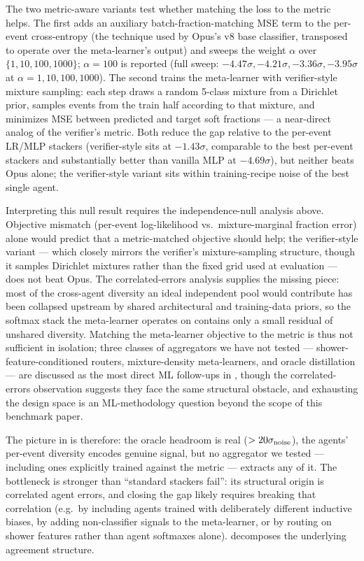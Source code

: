 \documentclass[universe,article,submit,pdftex,oneauthor]{Definitions/mdpi}
\begin{document}
The two metric-aware variants test whether matching the loss to the metric helps. The first adds an auxiliary batch-fraction-matching MSE term to the per-event cross-entropy (the technique used by Opus's v8 base classifier, transposed to operate over the meta-learner's output) and sweeps the weight $\alpha$ over $\{1, 10, 100, 1000\}$; $\alpha=100$ is reported (full sweep: $-4.47\sigma, -4.21\sigma, -3.36\sigma, -3.95\sigma$ at $\alpha=1,10,100,1000$). The second trains the meta-learner with verifier-style mixture sampling: each step draws a random 5-class mixture from a Dirichlet prior, samples events from the train half according to that mixture, and minimizes MSE between predicted and target soft fractions --- a near-direct analog of the verifier's metric. Both reduce the gap relative to the per-event LR/MLP stackers (verifier-style sits at $-1.43\sigma$, comparable to the best per-event stackers and substantially better than vanilla MLP at $-4.69\sigma$), but neither beats Opus alone; the verifier-style variant sits within training-recipe noise of the best single agent.

Interpreting this null result requires the independence-null analysis above. Objective mismatch (per-event log-likelihood vs.\ mixture-marginal fraction error) alone would predict that a metric-matched objective should help; the verifier-style variant --- which closely mirrors the verifier's mixture-sampling structure, though it samples Dirichlet mixtures rather than the fixed grid used at evaluation --- does not beat Opus. The correlated-errors analysis supplies the missing piece: most of the cross-agent diversity an ideal independent pool would contribute has been collapsed upstream by shared architectural and training-data priors, so the softmax stack the meta-learner operates on contains only a small residual of unshared diversity. Matching the meta-learner objective to the metric is thus not sufficient in isolation; three classes of aggregators we have not tested --- shower-feature-conditioned routers, mixture-density meta-learners, and oracle distillation --- are discussed as the most direct ML follow-ups in , though the correlated-errors observation suggests they face the same structural obstacle, and exhausting the design space is an ML-methodology question beyond the scope of this benchmark paper.

The picture in  is therefore: the oracle headroom is real ($>20\sigma_{\rm noise}$), the agents' per-event diversity encodes genuine signal, but no aggregator we tested --- including ones explicitly trained against the metric --- extracts any of it. The bottleneck is stronger than ``standard stackers fail'': its structural origin is correlated agent errors, and closing the gap likely requires breaking that correlation (e.g.\ by including agents trained with deliberately different inductive biases, by adding non-classifier signals to the meta-learner, or by routing on shower features rather than agent softmaxes alone).  decomposes the underlying agreement structure.
\end{document}
